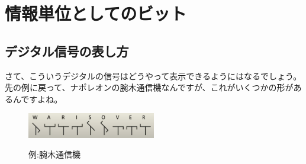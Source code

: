 \section{情報単位としてのビット}
\subsection{デジタル信号の表し方}
さて、こういうデジタルの信号はどうやって表示できるようにはなるでしょう。
先の例に戻って、ナポレオンの腕木通信機なんですが、これがいくつかの形があるんですよね。
\begin{figure}[H]
    \centering
    \includegraphics[width=0.5\textwidth]{lesson1/warisover.pdf}
    \label{fig: 1}
    \begin{center}
        \caption{例:腕木通信機}
    \end{center}
    
\end{figure}

